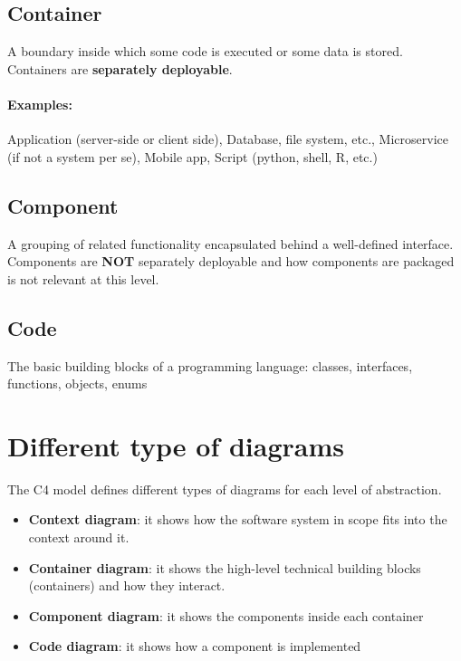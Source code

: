 \subsection{Container}
A boundary inside which some code is executed or some data is stored.
Containers are \textbf{separately deployable}.

\paragraph{Examples:} Application (server-side or client side), Database, file system, etc., Microservice (if not a system per se), Mobile app, Script (python, shell, R, etc.)



\subsection{Component}

A grouping of related functionality encapsulated behind a well-defined interface.
Components are \textbf{NOT} separately deployable and how
components are packaged is not relevant at this level.

\subsection{Code}

The basic building blocks of a programming language: classes, interfaces, functions, objects, enums



\section{Different type of diagrams}

The C4 model defines different types of diagrams for each level of abstraction.

\begin{itemize}
  \item \textbf{Context diagram}: it shows how the software system in scope fits into
        the context around it.
  \item \textbf{Container diagram}: it shows the high-level technical building blocks
        (containers) and how they interact.
  \item \textbf{Component diagram}: it shows the components inside each container
  \item \textbf{Code diagram}: it shows how a component is implemented
\end{itemize}


